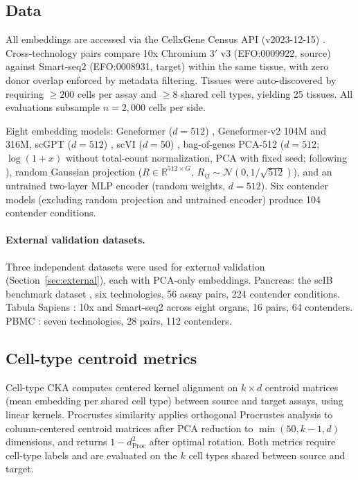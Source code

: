 \documentclass[11pt]{article}
\begin{document}
\subsection{Data}

All embeddings are accessed via the CellxGene Census API (v2023-12-15)
\citep{abdulla2025cellxgene}. Cross-technology pairs compare 10x
Chromium 3$'$ v3 (EFO:0009922, source) against Smart-seq2
(EFO:0008931, target) within the same tissue, with zero donor overlap
enforced by metadata filtering. Tissues were auto-discovered by
requiring $\geq 200$ cells per assay and $\geq 8$ shared cell types,
yielding 25 tissues. All evaluations subsample $n = 2{,}000$ cells per
side.

Eight embedding models: Geneformer ($d = 512$)
\citep{theodoris2023geneformer}, Geneformer-v2 104M and 316M,
scGPT ($d = 512$) \citep{cui2024scgpt}, scVI ($d = 50$)
\citep{lopez2018scvi}, bag-of-genes PCA-512 ($d = 512$;
$\log(1 + x)$ without total-count normalization, PCA with fixed seed;
following \citealp{cole2026morpheus}), random Gaussian projection
($R \in \mathbb{R}^{512 \times G}$, $R_{ij} \sim \mathcal{N}(0,
1/\sqrt{512})$), and an untrained two-layer MLP encoder (random weights,
$d = 512$). Six contender models (excluding random projection and
untrained encoder) produce 104 contender conditions.

\paragraph{External validation datasets.} Three independent datasets
were used for external validation (Section~\ref{sec:external}), each
with PCA-only embeddings. Pancreas: the scIB benchmark dataset
\citep{luecken2022scib}, six technologies, 56 assay pairs, 224
contender conditions. Tabula Sapiens \citep{tabulasapiens2022}: 10x and
Smart-seq2 across eight organs, 16 pairs, 64 contenders. PBMC
\citep{ding2020systematic}: seven technologies, 28 pairs, 112
contenders.

\subsection{Cell-type centroid metrics}

Cell-type CKA \citep{kornblith2019similarity} computes centered kernel
alignment on $k \times d$ centroid matrices (mean embedding per shared
cell type) between source and target assays, using linear kernels.
Procrustes similarity applies orthogonal Procrustes analysis to
column-centered centroid matrices after PCA reduction to $\min(50,
k-1, d)$ dimensions, and returns $1 - d_{\mathrm{Proc}}^2$ after
optimal rotation. Both metrics require cell-type labels and are
evaluated on the $k$ cell types shared between source and target.
\end{document}
